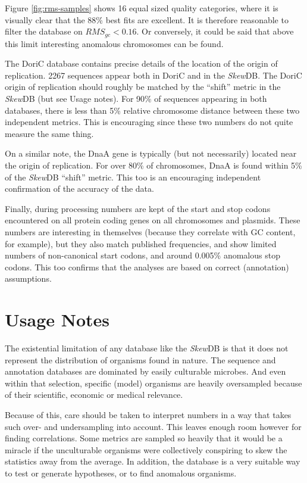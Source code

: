 \documentclass[fleqn,10pt]{wlscirep}
\begin{document}
Figure \ref{fig:rms-samples} shows 16 equal sized quality categories, where it is visually clear that the 88\% best fits are excellent. It is therefore reasonable to filter the database on $RMS_{gc}<0.16$. Or conversely, it could be said that above this limit interesting anomalous chromosomes can be found. 

The DoriC database \cite{luo_doric_2019} contains precise details of the location of the origin of replication. 2267 sequences appear both in DoriC and in the \emph{Skew}DB. The DoriC origin of replication should roughly be matched by the ``shift'' metric in the \emph{Skew}DB (but see Usage notes). For 90\% of sequences appearing in both databases, there is less than 5\% relative chromosome distance between these two independent metrics. This is encouraging since these two numbers do not quite measure the same thing.

On a similar note, the DnaA gene is typically (but not necessarily) located near the origin of replication. For over 80\% of chromosomes, DnaA is found within 5\% of the \emph{Skew}DB ``shift'' metric. This too is an encouraging independent confirmation of the accuracy of the data.

Finally, during processing numbers are kept of the start and stop codons encountered on all protein coding genes on all chromosomes and plasmids. These numbers are interesting in themselves (because they correlate with GC content, for example), but they also match published frequencies, and show limited numbers of non-canonical start codons, and around 0.005\% anomalous stop codons. This too confirms that the analyses are based on correct (annotation) assumptions.


\section*{Usage Notes}
The existential limitation of any database like the \emph{Skew}DB is that it does not represent the distribution of organisms found in nature. The sequence and annotation databases are dominated by easily culturable microbes. And even within that selection, specific (model) organisms are heavily oversampled because of their scientific, economic or medical relevance.

Because of this, care should be taken to interpret numbers in a way that takes such over- and undersampling into account. This leaves enough room however for finding correlations. Some metrics are sampled so heavily that it would be a miracle if the unculturable organisms were collectively conspiring to skew the statistics away from the average. In addition, the database is a very suitable way to test or generate hypotheses, or to find anomalous organisms.
\end{document}
